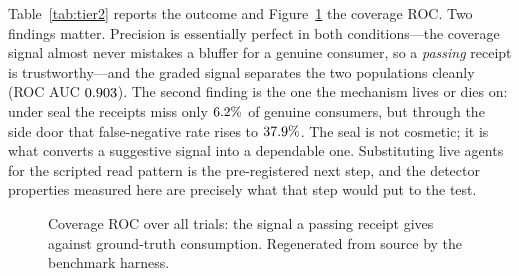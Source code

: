 \documentclass[10pt,twocolumn]{article}
\begin{document}
Table~\ref{tab:tier2} reports the outcome and Figure~\ref{fig:roc} the
coverage ROC. Two findings matter. Precision is essentially perfect in both
conditions---the coverage signal almost never mistakes a bluffer for a
genuine consumer, so a \emph{passing} receipt is trustworthy---and the
graded signal separates the two populations cleanly (ROC AUC
$0.903$). The second finding is the one the mechanism lives or dies
on: under seal the receipts miss only $6.2\%$ of genuine
consumers, but through the side door that false-negative rate rises to
$37.9\%$. The seal is not cosmetic; it is what converts a
suggestive signal into a dependable one. Substituting live agents for the
scripted read pattern is the pre-registered next step, and the detector
properties measured here are precisely what that step would put to the test.

\begin{figure}[t]
\centering
{}
\caption{Coverage ROC over all trials: the signal a passing receipt gives
against ground-truth consumption. Regenerated from source by the benchmark
harness.}
\label{fig:roc}
\end{figure}
\end{document}
